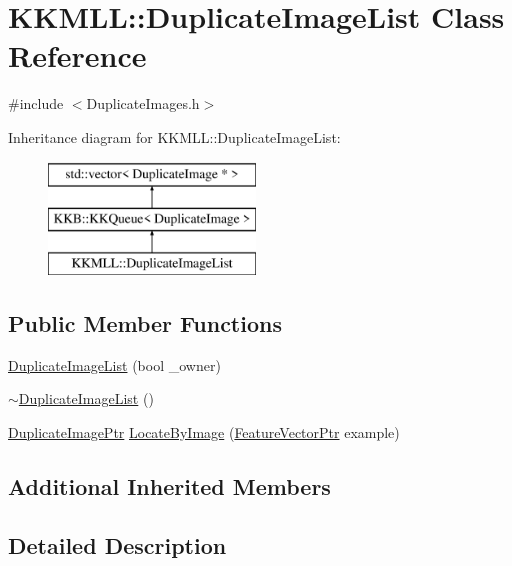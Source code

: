 \hypertarget{class_k_k_m_l_l_1_1_duplicate_image_list}{}\section{K\+K\+M\+LL\+:\+:Duplicate\+Image\+List Class Reference}
\label{class_k_k_m_l_l_1_1_duplicate_image_list}


{\ttfamily \#include $<$Duplicate\+Images.\+h$>$}

Inheritance diagram for K\+K\+M\+LL\+:\+:Duplicate\+Image\+List\+:\begin{figure}[H]
\begin{center}
\leavevmode
\includegraphics[height=3.000000cm]{class_k_k_m_l_l_1_1_duplicate_image_list}
\end{center}
\end{figure}
\subsection*{Public Member Functions}
\begin{DoxyCompactItemize}
\item 
\hyperlink{class_k_k_m_l_l_1_1_duplicate_image_list_ac306087adda2a6a86553f61a73f3a42a}{Duplicate\+Image\+List} (bool \+\_\+owner)
\item 
\hyperlink{class_k_k_m_l_l_1_1_duplicate_image_list_a4aae768ed98116e1f937a86f8360e9dc}{$\sim$\+Duplicate\+Image\+List} ()
\item 
\hyperlink{namespace_k_k_m_l_l_a55d6f703b6c805f96dc6af66f31d2be5}{Duplicate\+Image\+Ptr} \hyperlink{class_k_k_m_l_l_1_1_duplicate_image_list_a2cb6d2138592775258d3878ea0927c39}{Locate\+By\+Image} (\hyperlink{namespace_k_k_m_l_l_a0c5df3d48f45926fbc4fee04f5e3bc04}{Feature\+Vector\+Ptr} example)
\end{DoxyCompactItemize}
\subsection*{Additional Inherited Members}


\subsection{Detailed Description}


